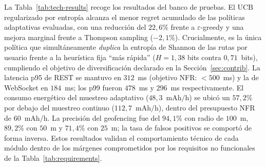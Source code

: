 \documentclass[a4paper,fleqn]{cas-sc}
\newcommand{\UCB}{UCB\xspace}
\begin{document}
	La Tabla~\ref{tab:tech-results} recoge los resultados del banco de pruebas. El \UCB regularizado por entrop\'ia alcanza el menor regret acumulado de las pol\'iticas adaptativas evaluadas, con una reducci\'on del $22{,}6\%$ frente a $\varepsilon$-greedy y una mejora marginal frente a Thompson sampling ($-2{,}1\%$). Crucialmente, es la \'unica pol\'itica que simult\'aneamente \emph{duplica} la entrop\'ia de Shannon de las rutas por usuario frente a la heur\'istica fija ``m\'as r\'apida'' ($H=1{,}38$ bits contra $0{,}71$~bits), cumpliendo el objetivo de diversificaci\'on declarado en la Secci\'on~\ref{sec:contrib}. La latencia p95 de REST se mantuvo en $312$~ms (objetivo NFR: $<500$~ms) y la de WebSocket en $184$~ms; los p99 fueron $478$~ms y $296$~ms respectivamente. El consumo energ\'etico del muestreo adaptativo ($48{,}3$~mAh$/$h) se ubic\'o un $57{,}2\%$ por debajo del muestreo continuo ($112{,}7$~mAh$/$h), dentro del presupuesto NFR de $60$~mAh$/$h. La precisi\'on del geofencing fue del $94{,}1\%$ con radio de $100$~m, $89{,}2\%$ con $50$~m y $71{,}4\%$ con $25$~m; la tasa de falsos positivos se comport\'o de forma inversa. Estos resultados validan el comportamiento t\'ecnico de cada m\'odulo dentro de los m\'argenes comprometidos por los requisitos no funcionales de la Tabla~\ref{tab:requirements}.
	
\end{document}
